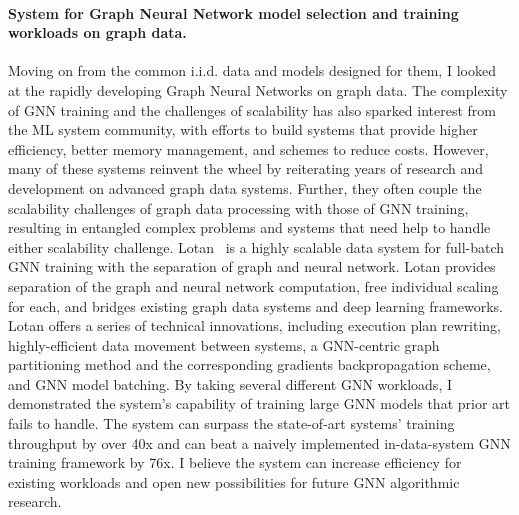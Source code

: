 \documentclass[letterpaper]{article}
\begin{document}
\paragraph{System for Graph Neural Network model selection and training workloads on graph data.}
Moving on from the common i.i.d. data and models designed for them, I looked at the rapidly developing Graph Neural Networks on graph data. The complexity of GNN training and the challenges of scalability has also sparked interest from the ML system community, with efforts to build systems that provide higher efficiency, better memory management, and schemes to reduce costs. However, many of these systems reinvent the wheel by reiterating years of research and development on advanced graph data systems. Further, they often couple the scalability challenges of graph data processing with those of GNN training, resulting in entangled complex problems and systems that need help to handle either scalability challenge. Lotan~\cite{lotan} is a highly scalable data system for full-batch GNN training with the separation of graph and neural network. Lotan provides separation of the graph and neural network computation, free individual scaling for each, and bridges existing graph data systems and deep learning frameworks. Lotan offers a series of technical innovations, including execution plan rewriting, highly-efficient data movement between systems, a GNN-centric graph partitioning method and the corresponding gradients backpropagation scheme, and GNN model batching. By taking several different GNN workloads, I demonstrated the system's capability of training large GNN models that prior art fails to handle. The system can surpass the state-of-art systems' training throughput by over 40x and can beat a naively implemented in-data-system GNN training framework by 76x. I believe the system can increase efficiency for existing workloads and open new possibilities for future GNN algorithmic research.
\end{document}
